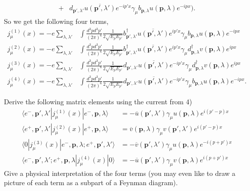 \documentclass[working, oneside]{../../../Preambles/tuftebook}
\begin{document}
\begin{solution}
\begin{align*}
    +&  d_{\mathbf{p'}, \lambda'} \overline{ u(\mathbf{p}', \lambda')} e^{-i p' x} \gamma_{\mu } b_{\mathbf{p}, \lambda} u(\mathbf{p}, \lambda) e^{-i p x} \big) 
.\end{align*}
So we get the following four terms,
\begin{align*}
    j_{\mu }^{\left( 1 \right) }\left( x \right) =-e\sum_{\lambda, \lambda'}& \int \frac{d^3pd^3p'}{\left( 2\pi \right) ^{6}}\frac{1}{2 \sqrt{E_p E_{p'}}} b_{\mathbf{p'}, \lambda'}^\dagger \overline{ u(\mathbf{p}', \lambda')} e^{i p' x} \gamma_{\mu } b_{\mathbf{p}, \lambda} u(\mathbf{p}, \lambda) e^{-i p x}\\
    j_{\mu }^{\left( 2 \right) }\left( x \right) =-e\sum_{\lambda, \lambda'}& \int \frac{d^3pd^3p'}{\left( 2\pi \right) ^{6}}\frac{1}{2 \sqrt{E_p E_{p'}}} b_{\mathbf{p'}, \lambda'}^\dagger \overline{ u(\mathbf{p}', \lambda')} e^{i p' x} \gamma_{\mu } d_{\mathbf{p}, \lambda}^\dagger v(\mathbf{p}, \lambda) e^{i p x}\\
    j_{\mu }^{\left( 3 \right) }\left( x \right) =-e\sum_{\lambda, \lambda'}& \int \frac{d^3pd^3p'}{\left( 2\pi \right) ^{6}}\frac{1}{2 \sqrt{E_p E_{p'}}} d_{\mathbf{p'}, \lambda'} \overline{ u(\mathbf{p}', \lambda')} e^{-i p' x} \gamma_{\mu } d_{\mathbf{p}, \lambda}^\dagger v(\mathbf{p}, \lambda) e^{i p x}\\
    j_{\mu }^{\left( 4 \right) }\left( x \right) =-e\sum_{\lambda, \lambda'}& \int \frac{d^3pd^3p'}{\left( 2\pi \right) ^{6}}\frac{1}{2 \sqrt{E_p E_{p'}}} d_{\mathbf{p'}, \lambda'} \overline{ u(\mathbf{p}', \lambda')} e^{-i p' x} \gamma_{\mu } b_{\mathbf{p}, \lambda} u(\mathbf{p}, \lambda) e^{-i p x}
.\end{align*}
\end{solution}
\begin{exercise}[5]
Derive the following matrix elements using the current from 4)
\begin{align*}
\langle e^{-}, \mathbf{p}', \lambda' | j_\mu^{(1)}(x) | e^{-}, \mathbf{p}, \lambda \rangle
&= - \overline{u}(\mathbf{p}', \lambda') \gamma_\mu u(\mathbf{p}, \lambda) e^{i (p' - p) x} \tag{21} \\
\langle e^{+}, \mathbf{p}', \lambda' | j_\mu^{(2)}(x) | e^{+}, \mathbf{p}, \lambda \rangle
&= \overline{v}(\mathbf{p}, \lambda) \gamma_\mu v(\mathbf{p}', \lambda') e^{i (p' - p) x} \tag{22} \\
\langle 0 | j_\mu^{(3)}(x) | e^{-}, \mathbf{p}, \lambda ; e^{+}, \mathbf{p}', \lambda' \rangle
&= - \overline{v}(\mathbf{p}', \lambda') \gamma_\mu u(\mathbf{p}, \lambda) e^{-i (p + p') x} \tag{23} \\
\langle e^{-}, \mathbf{p}', \lambda' ; e^{+}, \mathbf{p}, \lambda | j_\mu^{(4)}(x) | 0 \rangle
&= - \overline{u}(\mathbf{p}', \lambda') \gamma_\mu v(\mathbf{p}, \lambda) e^{i (p + p') x} \tag{24}
\end{align*}
Give a physical interpretation of the four terms (you may even like to draw a picture of each term as a subpart of a Feynman diagram).
\end{exercise}
\end{document}
